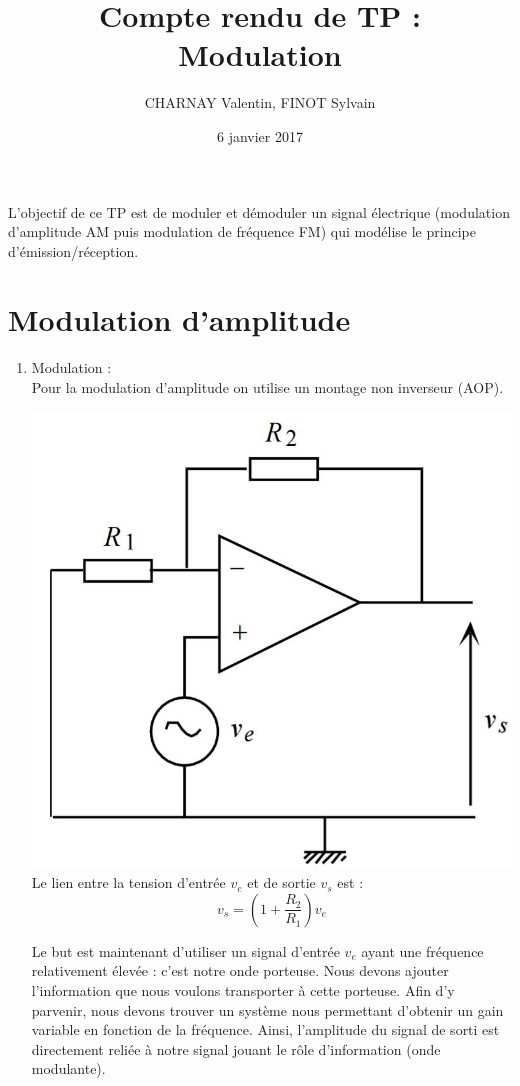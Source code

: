 \documentclass[12pt,a4paper]{article}
\author{CHARNAY Valentin, FINOT Sylvain}
\title{Compte rendu de TP : \\ Modulation}
\date{6 janvier 2017}
\begin{document}
\maketitle
L'objectif de ce TP est de moduler et démoduler un signal électrique (modulation d'amplitude AM puis modulation de fréquence FM) qui modélise le principe d'émission/réception.
\section{Modulation d'amplitude}
\begin{enumerate}
\item Modulation :\\
Pour la modulation d'amplitude on utilise un montage non inverseur (AOP).
\begin{multicols}{2}
\includegraphics[scale=0.2]{MontageNonInv}
\columnbreak
\\
Le lien entre la tension d'entrée $v_e$ et de sortie $v_s$ est :
$$v_s=(1+\dfrac{R_2}{R_1})v_e$$
\end{multicols} 
Le but est maintenant d'utiliser un signal d'entrée $v_e$ ayant une fréquence relativement élevée : c'est notre onde porteuse. Nous devons ajouter l'information que nous voulons transporter à cette porteuse. Afin d'y parvenir, nous devons trouver un système nous permettant d'obtenir un gain variable en fonction de la fréquence. Ainsi, l'amplitude du signal de sorti est directement reliée à notre signal jouant le rôle d'information (onde modulante).\\

\end{enumerate}
\end{document}
